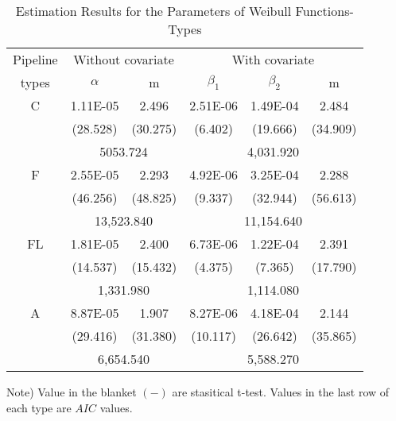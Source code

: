\begin{table}[t]
\caption{Estimation Results for the Parameters of Weibull Functions-Types}
\label{table51}
{\small
\begin{center}
\begin{tabular}{l|ll|lll}
\hline
\multicolumn{1}{c|}{Pipeline} & \multicolumn{2}{c|}{Without covariate} & \multicolumn{3}{c}{With covariate} \\ 
\multicolumn{1}{c|}{types} & \multicolumn{1}{c}{$\alpha$} & \multicolumn{1}{c|}{m} & \multicolumn{1}{c}{$\beta_1$} & \multicolumn{1}{c}{$\beta_2$} & \multicolumn{1}{c}{m} \\ 
\hline
\multicolumn{1}{c|}{C} & \multicolumn{1}{c}{1.11E-05} & \multicolumn{1}{c|}{2.496} & \multicolumn{1}{c}{2.51E-06} & \multicolumn{1}{c}{1.49E-04} & \multicolumn{1}{c}{2.484} \\ 
\multicolumn{1}{c|}{} & \multicolumn{1}{c}{(28.528)} & \multicolumn{1}{c|}{(30.275)} & \multicolumn{1}{c}{(6.402)} & \multicolumn{1}{c}{(19.666)} & \multicolumn{1}{c}{(34.909)} \\ 
\multicolumn{1}{c|}{} & \multicolumn{2}{c|}{5053.724 } & \multicolumn{3}{c}{4,031.920 } \\ 
\hline
\multicolumn{1}{c|}{F} & \multicolumn{1}{c}{2.55E-05} & \multicolumn{1}{c|}{2.293} & \multicolumn{1}{c}{4.92E-06} & \multicolumn{1}{c}{3.25E-04} & \multicolumn{1}{c}{2.288} \\ 
\multicolumn{1}{c|}{} & \multicolumn{1}{c}{(46.256)} & \multicolumn{1}{c|}{(48.825)} & \multicolumn{1}{c}{(9.337)} & \multicolumn{1}{c}{(32.944)} & \multicolumn{1}{c}{(56.613)} \\ 
\multicolumn{1}{c|}{} & \multicolumn{2}{c|}{13,523.840 } & \multicolumn{3}{c}{11,154.640 } \\ 
\hline
\multicolumn{1}{c|}{FL} & \multicolumn{1}{c}{1.81E-05} & \multicolumn{1}{c|}{2.400} & \multicolumn{1}{c}{6.73E-06} & \multicolumn{1}{c}{1.22E-04} & \multicolumn{1}{c}{2.391} \\ 
\multicolumn{1}{c|}{} & \multicolumn{1}{c}{(14.537)} & \multicolumn{1}{c|}{(15.432)} & \multicolumn{1}{c}{(4.375)} & \multicolumn{1}{c}{(7.365)} & \multicolumn{1}{c}{(17.790)} \\ 
\multicolumn{1}{c|}{} & \multicolumn{2}{c|}{1,331.980 } & \multicolumn{3}{c}{1,114.080 } \\ 
\hline
\multicolumn{1}{c|}{A} & \multicolumn{1}{c}{8.87E-05} & \multicolumn{1}{c|}{1.907} & \multicolumn{1}{c}{8.27E-06} & \multicolumn{1}{c}{4.18E-04} & \multicolumn{1}{c}{2.144} \\ 
\multicolumn{1}{c|}{} & \multicolumn{1}{c}{(29.416)} & \multicolumn{1}{c|}{(31.380)} & \multicolumn{1}{c}{(10.117)} & \multicolumn{1}{c}{(26.642)} & \multicolumn{1}{c}{(35.865)} \\ 
\multicolumn{1}{c|}{} & \multicolumn{2}{c|}{6,654.540 } & \multicolumn{3}{c}{5,588.270 } \\ 
\hline
\end{tabular}
\end{center}
}
{\small Note) Value in the blanket $(-)$ are stasitical t-test. Values in the last row of each type are $AIC$ values.}
\end{table}%
%

